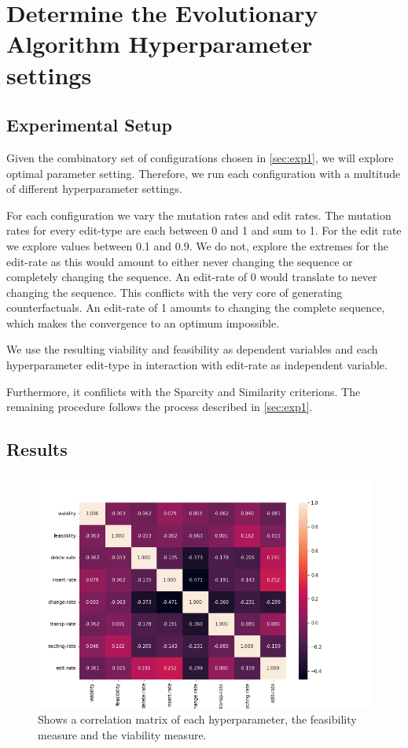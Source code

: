 \documentclass[./../../paper.tex]{subfiles}
\begin{document}
\section{Determine the Evolutionary Algorithm Hyperparameter settings}

\subsection{Experimental Setup}
\label{sec:exp2}
Given the combinatory set of configurations chosen in \autoref{sec:exp1}, we will explore optimal parameter setting. Therefore, we run each configuration with a multitude of different hyperparameter settings.

For each configuration we vary the mutation rates and edit rates. The mutation rates for every edit-type are each between 0 and 1 and sum to 1. For the edit rate we explore values between 0.1 and 0.9. We do not, explore the extremes for the edit-rate as this would amount to either never changing the sequence or completely changing the sequence. An edit-rate of 0 would translate to never changing the sequence. This conflicts with the very core of generating counterfactuals. An edit-rate of 1 amounts to changing the complete sequence, which makes the convergence to an optimum impossible.

We use the resulting viability and feasibility as dependent variables and each hyperparameter edit-type in interaction with edit-rate as independent variable.

Furthermore, it confilicts with the Sparcity and Similarity criterions. The remaining procedure follows the process described in \autoref{sec:exp1}.


\subsection{Results}

\begin{figure}
    \centering
    \includegraphics[width=\textwidth]{figures/results/params_heatmap.png}
    \caption{Shows a correlation matrix of each hyperparameter, the feasibility measure and the viability measure.}
    \label{fig:param_results_1}
\end{figure}
\end{document}
